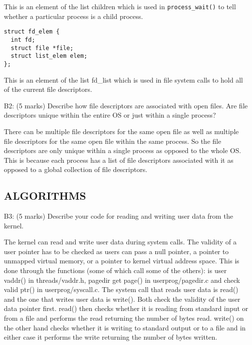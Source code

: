 This is an element of the list children which is used in \texttt{process\_wait()} to tell whether a particular process is a child process.

\begin{verbatim}
struct fd_elem {
  int fd;
  struct file *file;
  struct list_elem elem;
};
\end{verbatim}

This is an element of the list fd_list which is used in file system calls to hold all of the current file descriptors.




\noindent B2: (5 marks)
Describe how file descriptors are associated with open files.
Are file descriptors unique within the entire OS or just within a
single process?


There can be multiple file descriptors for the same open file as well as multiple file descriptors for the same open file within the same process. So the file descriptors are only unique within a single process as opposed to the whole OS. This is because each process has a list of file descriptors associated with it as opposed to a global collection of file descriptors.


\subsection*{ALGORITHMS}

\noindent B3: (5 marks)
Describe your code for reading and writing user data from the
kernel.


The kernel can read and write user data during system calls. The validity of a user pointer has to be checked as users can pass a null pointer, a pointer to unmapped virtual memory, or a pointer to kernel virtual address space. This is done through the functions (some of which call some of the others): is user vaddr() in threads/vaddr.h, pagedir get page() in userprog/pagedir.c and check valid ptr() in userprog/syscall.c. The system call that reads user data is read() and the one that writes user data is write(). Both check the validity of the user data pointer first. read() then checks whether it is reading from standard input or from a file and performs the read returning the number of bytes read. write() on the other hand checks whether it is writing to standard output or to a file and in either case it performs the write returning the number of bytes written.

